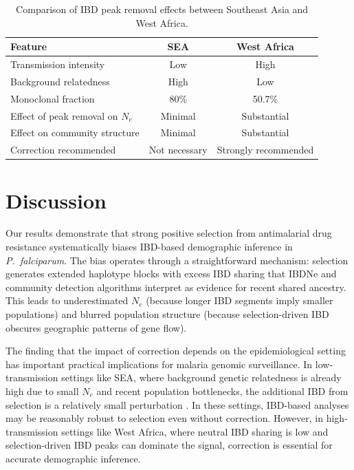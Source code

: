 \documentclass[11pt]{article}
\begin{document}
\begin{table}[htbp]
\centering
\caption{Comparison of IBD peak removal effects between Southeast Asia and West Africa.}
\label{tab:sea_vs_waf}
\begin{tabular}{lcc}
\toprule
\textbf{Feature} & \textbf{SEA} & \textbf{West Africa} \\
\midrule
Transmission intensity & Low & High \\
Background relatedness & High & Low \\
Monoclonal fraction & 80\% & 50.7\% \\
Effect of peak removal on $N_e$ & Minimal & Substantial \\
Effect on community structure & Minimal & Substantial \\
Correction recommended & Not necessary & Strongly recommended \\
\bottomrule
\end{tabular}
\end{table}

\section{Discussion}

Our results demonstrate that strong positive selection from antimalarial drug resistance systematically biases IBD-based demographic inference in \textit{P.~falciparum}. The bias operates through a straightforward mechanism: selection generates extended haplotype blocks with excess IBD sharing that IBDNe and community detection algorithms interpret as evidence for recent shared ancestry. This leads to underestimated $N_e$ (because longer IBD segments imply smaller populations) and blurred population structure (because selection-driven IBD obscures geographic patterns of gene flow).

The finding that the impact of correction depends on the epidemiological setting has important practical implications for malaria genomic surveillance. In low-transmission settings like SEA, where background genetic relatedness is already high due to small $N_e$ and recent population bottlenecks, the additional IBD from selection is a relatively small perturbation \citep{miotto2015resistance}. In these settings, IBD-based analyses may be reasonably robust to selection even without correction. However, in high-transmission settings like West Africa, where neutral IBD sharing is low and selection-driven IBD peaks can dominate the signal, correction is essential for accurate demographic inference.
\end{document}
